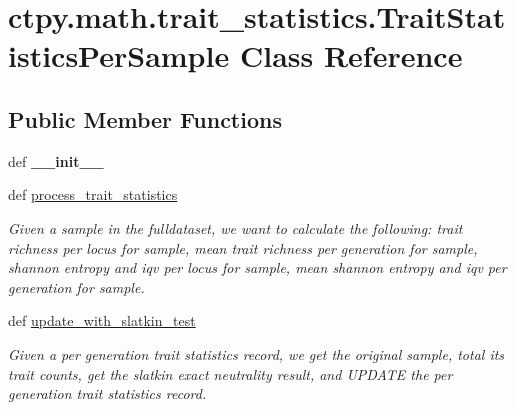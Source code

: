 \hypertarget{classctpy_1_1math_1_1trait__statistics_1_1_trait_statistics_per_sample}{\section{ctpy.\-math.\-trait\-\_\-statistics.\-Trait\-Statistics\-Per\-Sample Class Reference}
\label{classctpy_1_1math_1_1trait__statistics_1_1_trait_statistics_per_sample}
}
\subsection*{Public Member Functions}
\begin{DoxyCompactItemize}
\item 
\hypertarget{classctpy_1_1math_1_1trait__statistics_1_1_trait_statistics_per_sample_ab11ed10d974dd4f2873ef6a283ed30ab}{def {\bfseries \-\_\-\-\_\-init\-\_\-\-\_\-}}\label{classctpy_1_1math_1_1trait__statistics_1_1_trait_statistics_per_sample_ab11ed10d974dd4f2873ef6a283ed30ab}

\item 
def \hyperlink{classctpy_1_1math_1_1trait__statistics_1_1_trait_statistics_per_sample_a368e901d667a703f72ef4b6aff9738b5}{process\-\_\-trait\-\_\-statistics}
\begin{DoxyCompactList}\small\item\em Given a sample in the fulldataset, we want to calculate the following\-: trait richness per locus for sample, mean trait richness per generation for sample, shannon entropy and iqv per locus for sample, mean shannon entropy and iqv per generation for sample. \end{DoxyCompactList}\item 
def \hyperlink{classctpy_1_1math_1_1trait__statistics_1_1_trait_statistics_per_sample_a6c5bd126d94e0b27407d70fd5fc035a6}{update\-\_\-with\-\_\-slatkin\-\_\-test}
\begin{DoxyCompactList}\small\item\em Given a per generation trait statistics record, we get the original sample, total its trait counts, get the slatkin exact neutrality result, and U\-P\-D\-A\-T\-E the per generation trait statistics record. \end{DoxyCompactList}\end{DoxyCompactItemize}

